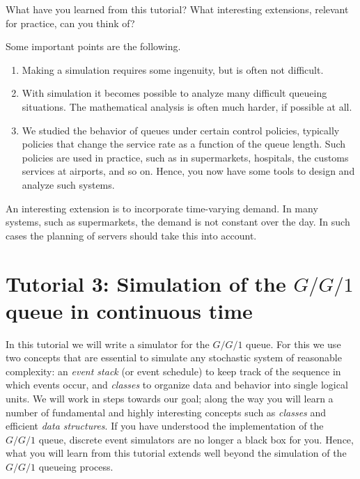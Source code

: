 \begin{exercise}
  What have you learned from this tutorial? What interesting extensions, relevant for practice,  can you think of?
  \begin{solution}
    Some important points are the following.
    \begin{enumerate}
    \item  Making a  simulation requires some ingenuity, but is often not difficult.
    \item With simulation it becomes possible to analyze many difficult queueing situations. The mathematical analysis is often much harder, if possible at all.
    \item We studied the behavior of queues under certain control policies, typically policies that change the service rate as a function of the queue length. Such policies are used in practice, such as in supermarkets, hospitals, the customs services at airports, and so on. Hence, you now have some tools to design and analyze such systems. 
    \end{enumerate}

An interesting extension is to incorporate time-varying demand. In many systems, such as supermarkets, the demand is not constant over the day. In such cases the planning of servers should take this into account. 

  \end{solution}
\end{exercise}

\clearpage

\section{Tutorial 3: Simulation of the $G/G/1$ queue in continuous time}
\label{sec:simulation-gg1-queue}

In this tutorial we will write a simulator for the $G/G/1$ queue.
For this we use two concepts that are essential to simulate any stochastic system of reasonable complexity: an \emph{event stack} (or event schedule) to keep track of the sequence in which events occur, and \emph{classes} to organize data and behavior into single logical units.
We will work in steps towards our goal; along the way you will learn a number of fundamental and highly interesting concepts such as \emph{classes} and efficient \emph{data structures}.
If you have understood the implementation of the $G/G/1$ queue, discrete event simulators are no longer a black box for you.
Hence, what you will learn from this tutorial extends well beyond the simulation of the $G/G/1$ queueing process.

